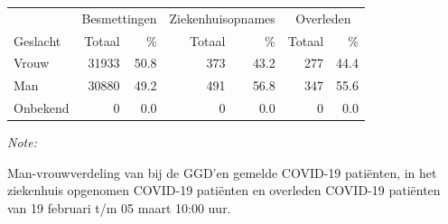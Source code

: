 \documentclass[
  english,
  man,floatsintext]{apa6}
\begin{document}
\begin{table}
\centering\begingroup\fontsize{11}{13}\selectfont

\begin{threeparttable}
\begin{tabular}{lrrrrrr}
\toprule
\multicolumn{1}{c}{ } & \multicolumn{2}{c}{Besmettingen} & \multicolumn{2}{c}{Ziekenhuisopnames} & \multicolumn{2}{c}{Overleden} \\
\cmidrule(l{3pt}r{3pt}){2-3} \cmidrule(l{3pt}r{3pt}){4-5} \cmidrule(l{3pt}r{3pt}){6-7}
Geslacht & Totaal & \% & Totaal & \% & Totaal & \%\\
\midrule
Vrouw & 31933 & 50.8 & 373 & 43.2 & 277 & 44.4\\
Man & 30880 & 49.2 & 491 & 56.8 & 347 & 55.6\\
Onbekend & 0 & 0.0 & 0 & 0.0 & 0 & 0.0\\
\bottomrule
\end{tabular}
\begin{tablenotes}
\item \textit{Note: } 
\item Man-vrouwverdeling van bij de GGD’en gemelde COVID-19 patiënten, in het ziekenhuis opgenomen COVID-19 patiënten en overleden COVID-19 patiënten van 19 februari t/m 05 maart 10:00 uur.
\end{tablenotes}
\end{threeparttable}
\endgroup{}
\end{table}
\newpage
\end{document}
